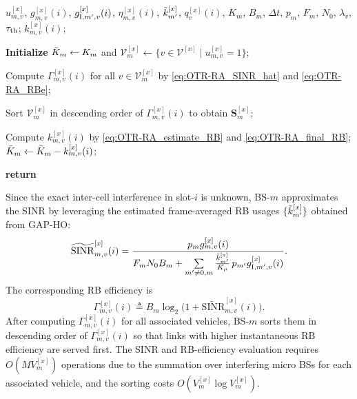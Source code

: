 \documentclass[conference, a4paper]{IEEEtran}
\theoremstyle{remark}
\begin{document}
\begin{algorithm}[tbp]
    \caption{Opportunistic Tiered-Rounding Resource Allocation (OTR-RA)}
    \label{alg:OTR-RA}
    \renewcommand{\algorithmicrequire}{\textbf{Input:}}
    \renewcommand{\algorithmicensure}{\textbf{Output:}}
    \begin{algorithmic}[1]
        \REQUIRE
        $u_{m,v}^{[x]}$, $g_{m,v}^{[x]}(i)$, $g_{{\rm I},m',v}^{[x]}(i)$, $\eta_{m,v}^{[x]}(i)$,
        $\Tilde{k}_{m'}^{[x]}$, $q_v^{[x]}(i)$, $K_m$, $B_m$, $\Delta t$,
        $p_m$, $F_m$, $N_0$, $\lambda_v$, $\tau_{\rm th}$;
        \ENSURE
        $k_{m,v}^{[x]}(i)$;

        \STATE \textbf{Initialize} $\Bar{K}_m \gets K_m$ and
               $\mathcal{V}_m^{[x]} \gets \{ v \in \mathcal{V}^{[x]} \mid u_{m,v}^{[x]} = 1 \}$;

        \STATE Compute $\Gamma_{m,v}^{[x]}(i)$ for all $v \in \mathcal{V}_m^{[x]}$ by \eqref{eq:OTR-RA_SINR_hat} and \eqref{eq:OTR-RA_RBe};

        \STATE Sort $\mathcal{V}_m^{[x]}$ in descending order of $\Gamma_{m,v}^{[x]}(i)$
               to obtain $\bm{S}_m^{[x]}$;

            \STATE Compute $k_{m,v}^{[x]}(i)$ by \eqref{eq:OTR-RA_estimate_RB} and \eqref{eq:OTR-RA_final_RB};
            \STATE $\Bar{K}_m \gets \Bar{K}_m - k_{m,v}^{[x]}(i)$;
        \ENDFOR

        \STATE \textbf{return}
    \end{algorithmic}
\end{algorithm}

Since the exact inter-cell interference in slot-$i$ is unknown, BS-$m$ approximates the SINR by leveraging the estimated frame-averaged RB usages $\{\Tilde{k}_{m'}^{[x]}\}$ obtained from GAP-HO:
\begin{equation}
\label{eq:OTR-RA_SINR_hat}
    \widetilde{\mathrm{SINR}}_{m,v}^{[x]}(i)
    =
    \frac{p_m g_{m,v}^{[x]}(i)}
         {F_m N_0 B_m
          + \sum\limits_{m'\neq 0,m}
            \frac{\Tilde{k}_{m'}^{[x]}}{K_\mu}\, p_{m'} g_{{\rm I},m',v}^{[x]}(i)}.
\end{equation}
The corresponding RB efficiency is
\begin{equation}
    \label{eq:OTR-RA_RBe}
    \Gamma_{m,v}^{[x]}(i)
    \triangleq
    B_m\log_2\!\bigl(1+\widetilde{\mathrm{SINR}}_{m,v}^{[x]}(i)\bigr).
\end{equation}
After computing $\Gamma_{m,v}^{[x]}(i)$ for all associated vehicles, BS-$m$ sorts them in descending order of $\Gamma_{m,v}^{[x]}(i)$ so that links with higher instantaneous RB efficiency are served first. The SINR and RB-efficiency evaluation requires $O (MV^{[x]}_{m} )$ operations due to the summation over interfering micro BSs for each associated vehicle, and the sorting costs $O (V^{[x]}_{m}\log V^{[x]}_{m} )$.
\end{document}
